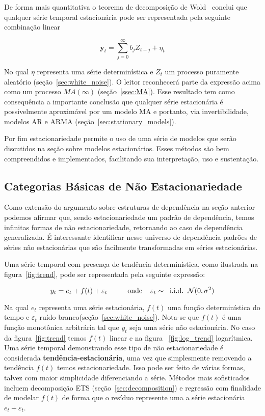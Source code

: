De forma mais quantitativa o teorema de decomposição de Wold~\cite{chatfield}
conclui que qualquer série temporal estacionária pode ser representada pela
seguinte combinação linear

$$\mathbf{y}_t = \sum_{j=0}^\infty b_j Z_{t-j} + \eta_t$$

No qual $\eta$ representa uma série determinística e $Z_t$ um processo
puramente aleatório (seção~\ref{sec:white_noise}). O leitor reconhecerá parte da expressão
acima como um processo $MA(\infty)$ (seção~\ref{ssec:MA}). Esse resultado tem
como consequência a importante conclusão que qualquer série estacionária é
possivelmente aproximável por um modelo MA e portanto, via invertibilidade,
modelos AR e ARMA (seção~\ref{sec:stationary_models}).

Por fim estacionariedade permite o uso de uma série de modelos que serão
discutidos na seção sobre modelos estacionários. Esses métodos são bem
compreendidos e implementados, facilitando sua interpretação, uso e
sustentação.

\subsection{Categorias Básicas de Não Estacionariedade}\label{ssec:taxonomy}

Como extensão do argumento sobre estruturas de dependência na seção anterior
podemos afirmar que, sendo estacionariedade um padrão de dependência, temos
infinitas formas de não estacionariedade, retornando ao caso de dependência
generalizada. É interessante identificar nesse universo de dependência padrões
de séries não estacionárias que são facilmente transformadas em séries
estacionárias.

Uma série temporal com presença de tendência determinística, como ilustrada na
figura~\ref{fig:trend}, pode ser representada pela seguinte expressão:

$$  y_t = e_t + f(t) + \varepsilon_t  \hspace{1cm}\text{onde} \hspace{.4cm}\varepsilon_t \sim \hspace{.2cm}\text{i.i.d.} \hspace{.2cm}\mathcal{N}(0, \sigma^2)$$

Na qual $e_t$ representa uma série estacionária, $f(t)$ uma função
determinística do tempo e $\varepsilon_t$ ruído
branco(seção~\ref{sec:white_noise}). Nota-se que $f(t)$ é uma função
monotônica arbitrária tal que $y_t$ seja uma série não estacionária. No caso da
figura~\ref{fig:trend} temos $f(t)$ linear e na figura ~\ref{fig:log_trend}
logarítmica. Uma série temporal demonstrando esse tipo de não estacionariedade
é considerada \textbf{tendência-estacionária}, uma vez que simplesmente
removendo a tendência $f(t)$ temos estacionariedade. Isso pode ser feito de
várias formas, talvez com maior simplicidade diferenciando a série. Métodos
mais sofisticados incluem decomposição ETS (seção~\ref{sec:decomposition}) e
regressão com finalidade de modelar $f(t)$ de forma que o resíduo represente
uma a série estacionária $e_t + \varepsilon_t$.

